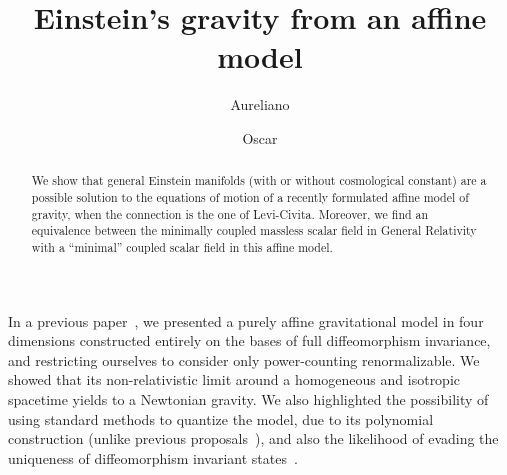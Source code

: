 \documentclass[aps,prl,twocolumn,superscriptaddress,showpacs,showkeys]{revtex4-1}
\begin{document}
\title{Einstein's gravity from an affine model}


\author{Aureliano }

\author{Oscar }

\begin{abstract}
  We show that general Einstein manifolds (with or without cosmological constant) are a possible solution to the equations of motion of a recently formulated affine model of gravity, when the connection is the one of Levi-Civita. Moreover, we find an equivalence between the minimally coupled massless scalar field in General Relativity with a ``minimal'' coupled scalar field in this affine model.
\end{abstract}



\maketitle

In a previous paper~\cite{Skirzewski:2014eta}, we presented a purely affine gravitational model in four dimensions constructed entirely on the bases of full diffeomorphism invariance, and restricting ourselves to consider only power-counting renormalizable. We showed that its non-relativistic limit around a homogeneous and isotropic spacetime yields to a Newtonian gravity. We also highlighted the possibility of using standard methods to quantize the model, due to its polynomial construction (unlike previous proposals~\cite{Eddington1923math,schrodinger1950space}), and also the likelihood of evading the uniqueness of diffeomorphism invariant states~\cite{Lewandowski:2005jk}.
\end{document}

